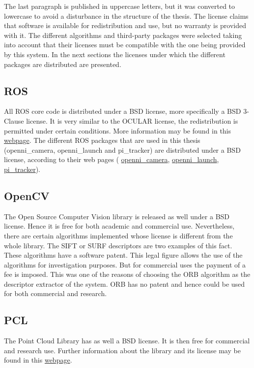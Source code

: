 	The last paragraph is published in uppercase letters, but it was converted to lowercase to avoid a disturbance in the structure of the thesis. 	
	The license claims that software is available for redistribution and use, but no warranty is provided with it. 
	The different algorithms and third-party packages were selected taking into account that their licenses must be compatible with the one being provided by this system. 
	In the next sections the licenses under which the different packages are distributed are presented. 


	\subsection{ROS}
	All ROS core code is distributed under a BSD license, more specifically a BSD 3-Clause license. 
	It is very similar to the OCULAR license, the redistribution is permitted under certain conditions. 
	More information may be found in this \href{http://opensource.org/licenses/BSD-3-Clause}{\color{blue} {webpage}}. 
	The different ROS packages that are used in this thesis (openni\_camera, openni\_launch and pi\_tracker) are distributed under a BSD license, according to their web pages ( \href{http://wiki.ros.org/openni_camera}{openni\_camera}, \href{http://wiki.ros.org/openni_launch}{openni\_launch}, \href{http://wiki.ros.org/pi_tracker}{pi\_tracker}).

	\subsection{OpenCV}
	The Open Source Computer Vision library is released as well under a BSD license. 
	Hence it is free for both academic and commercial use. 
	Nevertheless, there are certain algorithms implemented whose license is different from the whole library. 
	The SIFT or SURF descriptors are two examples of this fact. 
	These algorithms have a software patent. 
	This legal figure allows the use of the algorithms for investigation purposes. 
	But for commercial uses the payment of a fee is imposed. 
	This was one of the reasons of choosing the ORB algorithm as the descriptor extractor of the system. 
	ORB has no patent and hence could be used for both commercial and research. 

	\subsection{PCL}
	The Point Cloud Library has as well a BSD license. 
	It is then free for commercial and research use. 
	Further information about the library and its license may be found in this \href{http://pointclouds.org}{\color{blue} {webpage}}. 


